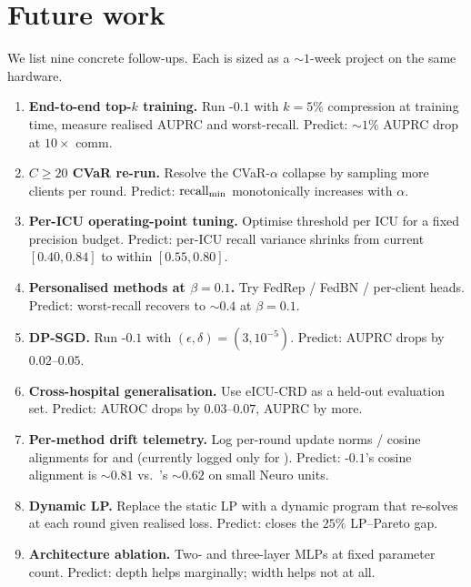 \section{Future work}
\label{sec:future}

We list nine concrete follow-ups. Each is sized as a $\sim$$1$-week project on
the same hardware.

\begin{enumerate}[leftmargin=*,topsep=2pt]
    \item \textbf{End-to-end top-$k$ training.} Run \fedprox{}-$0.1$ with $k\!=\!5\%$
        compression at training time, measure realised AUPRC and worst-recall.
        Predict: $\sim 1\%$ AUPRC drop at $10\!\times$ comm.
    \item \textbf{$C\!\geq\!20$ CVaR re-run.} Resolve the CVaR-$\alpha$ collapse
        by sampling more clients per round. Predict: $\text{recall}_{\min}{}$
        monotonically increases with $\alpha$.
    \item \textbf{Per-ICU operating-point tuning.} Optimise threshold per ICU
        for a fixed precision budget. Predict: per-ICU recall variance shrinks
        from current $[0.40, 0.84]$ to within $[0.55, 0.80]$.
    \item \textbf{Personalised methods at $\beta\!=\!0.1$.} Try FedRep / FedBN /
        per-client heads. Predict: worst-recall recovers to $\sim 0.4$ at
        $\beta\!=\!0.1$.
    \item \textbf{DP-SGD.} Run \fedprox{}-$0.1$ with $(\epsilon, \delta) =
        (3, 10^{-5})$. Predict: AUPRC drops by $0.02$--$0.05$.
    \item \textbf{Cross-hospital generalisation.} Use eICU-CRD as a held-out
        evaluation set. Predict: AUROC drops by $0.03$--$0.07$, AUPRC by more.
    \item \textbf{Per-method drift telemetry.} Log per-round update norms /
        cosine alignments for \fedprox{} and \cvar{} (currently logged only
        for \fedavg{}). Predict: \fedprox{}-$0.1$'s cosine alignment is
        $\sim 0.81$ vs.\ \fedavg{}'s $\sim 0.62$ on small Neuro units.
    \item \textbf{Dynamic LP.} Replace the static LP with a dynamic program
        that re-solves at each round given realised loss. Predict: closes the
        $25\%$ LP--Pareto gap.
    \item \textbf{Architecture ablation.} Two- and three-layer MLPs at fixed
        parameter count. Predict: depth helps marginally; width helps not at all.
\end{enumerate}

